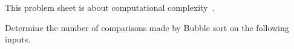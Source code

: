 \documentclass[a4paper, 12pt]{exam}
\begin{document}
\noindent
This problem sheet is about computational complexity~\cite{sipserbook}.

\begin{questions}

\question
Determine the number of comparisons made by Bubble sort on the following inputs.
\begin{parts}
  \part $[3,2,1]$
  \part $[4,3,2,1]$
  \part $[5,4,3,2,1]$
  \part $[6,5,4,3,2,1]$
  \part $[20,19,18,\ldots,3,2,1]$
  \part $[3,4,5,2,1]$
  \part $[4,5,1,2,3]$
\end{parts}
\begin{solution}
\end{solution}
\end{questions}
\end{document}
